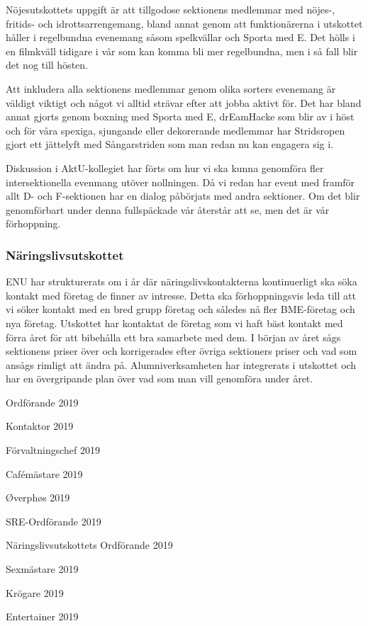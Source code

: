 \documentclass[../_main/handlingar.tex]{subfiles}
\begin{document}
Nöjesutskottets uppgift är att tillgodose sektionens medlemmar med nöjes-, fritids- och idrottsarrengemang, bland annat genom att funktionärerna i utskottet håller i regelbundna evenemang såsom spelkvällar och Sporta med E. Det hölls i en filmkväll tidigare i vår som kan komma bli mer regelbundna, men i så fall blir det nog till hösten. 

Att inkludera alla sektionens medlemmar genom olika sorters evenemang är väldigt viktigt och något vi alltid strävar efter att jobba aktivt för. Det har bland annat gjorts genom boxning med Sporta med E, drEamHacke som blir av i höst och för våra spexiga, sjungande eller dekorerande medlemmar har Stridsropen gjort ett jättelyft med Sångarstriden som man redan nu kan engagera sig i. 

Diskussion i AktU-kollegiet har förts om hur vi ska kunna genomföra fler intersektionella evenmang utöver nollningen. Då vi redan har event med framför allt D- och F-sektionen har en dialog påbörjats med andra sektioner. Om det blir genomförbart under denna fullspäckade vår återstår att se, men det är vår förhoppning. 

\subsubsection*{Näringslivsutskottet}

ENU har strukturerats om i år där näringslivskontakterna kontinuerligt ska söka kontakt med företag de finner av intresse. Detta ska förhoppningsvis leda till att vi söker kontakt med en bred grupp företag och således nå fler BME-företag och nya företag. Utskottet har kontaktat de företag som vi haft bäst kontakt med förra året för att bibehålla ett bra samarbete med dem. I början av året sågs sektionens priser över och korrigerades efter övriga sektioners priser och vad som ansågs rimligt att ändra på. Alumniverksamheten har integrerats i utskottet och har en övergripande plan över vad som man vill genomföra under året.


\newpage
\begin{signatures}{10}
    \mvh
    \signature{\ordf}{Ordförande 2019}
    \signature{\sekr}{Kontaktor 2019}
    \signature{\fvc}{Förvaltningschef 2019}
    \signature{\cafem}{Cafémästare 2019}
    \signature{\oph}{Øverphøs 2019}
    \signature{\sreordf}{SRE-Ordförande 2019}
    \signature{\enuordf}{Näringslivsutskottets Ordförande 2019}
    \signature{\sexm}{Sexmästare 2019}
    \signature{\krog}{Krögare 2019}
    \signature{\ent}{Entertainer 2019}
\end{signatures}
\end{document}
